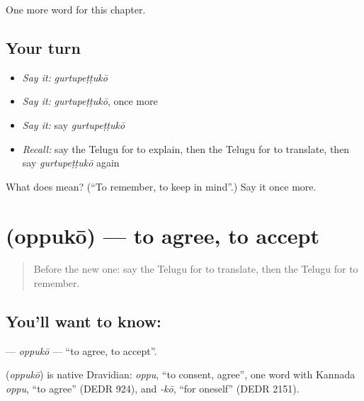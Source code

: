 \begin{grammarlens}[title={What you've built}]
One more word for this chapter.
\end{grammarlens}

\subsection*{Your turn}
\begin{itemize}
\raggedright
  \item \emph{Say it:} \emph{gurtupeṭṭukō}
  \item \emph{Say it:} \emph{gurtupeṭṭukō}, once more
  \item \emph{Say it:} say \emph{gurtupeṭṭukō}
  \item \emph{Recall:} say the Telugu for to explain, then the Telugu for to translate, then say \emph{gurtupeṭṭukō} again
\end{itemize}

\begin{tcolorbox}[breakable,colback=teal!4,colframe=teal!35!black,title={Before you move on}]
What does  mean? (\textquotedblleft{}To remember, to keep in mind\textquotedblright{}.) Say it once more.
\end{tcolorbox}
\section[\texorpdfstring{\te{ఒప్పుకో} (oppukō)}{ఒప్పుకో (oppukō)}]{ (oppukō) — to agree, to accept}

\label{lesson:TE-C160-oppuko}



\begin{quote}
Before the new one: say the Telugu for to translate, then the Telugu for to remember.
\end{quote}

\subsection*{You'll want to know: }
\textbf{} — \emph{oppukō} — \textquotedblleft{}to agree, to accept\textquotedblright{}.

\begin{cousinweb}
\textbf{} (\emph{oppukō}) is native Dravidian: \emph{oppu}, \textquotedblleft{}to consent, agree\textquotedblright{}, one word with Kannada \emph{oppu}, \textquotedblleft{}to agree\textquotedblright{} (DEDR 924), and \emph{-kō}, \textquotedblleft{}for oneself\textquotedblright{} (DEDR 2151).
\end{cousinweb}

